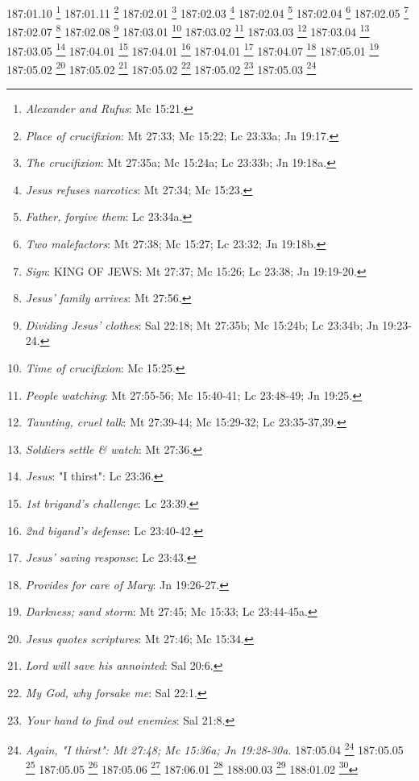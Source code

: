 {{{{{{{{{{{{{{{{{{{{{{{{{{{{{{{{{{{{{{{{{{{{{{{{{{{{{{{{{{{{{{{{{{{{{{{{{{{{{{{{{{{{{{{{{{{{{{187:01.10 \footnote{\textit{Alexander and Rufus}: Mc 15:21.}
187:01.11 \footnote{\textit{Place of crucifixion}: Mt 27:33; Mc 15:22; Lc 23:33a; Jn 19:17.}
187:02.01 \footnote{\textit{The crucifixion}: Mt 27:35a; Mc 15:24a; Lc 23:33b; Jn 19:18a.}
187:02.03 \footnote{\textit{Jesus refuses narcotics}: Mt 27:34; Mc 15:23.}
187:02.04 \footnote{\textit{Father, forgive them}: Lc 23:34a.}
187:02.04 \footnote{\textit{Two malefactors}: Mt 27:38; Mc 15:27; Lc 23:32; Jn 19:18b.}
187:02.05 \footnote{\textit{Sign}: KING OF JEWS: Mt 27:37; Mc 15:26; Lc 23:38; Jn 19:19-20.}
187:02.07 \footnote{\textit{Jesus' family arrives}: Mt 27:56.}
187:02.08 \footnote{\textit{Dividing Jesus' clothes}: Sal 22:18; Mt 27:35b; Mc 15:24b; Lc 23:34b; Jn 19:23-24.}
187:03.01 \footnote{\textit{Time of crucifixion}: Mc 15:25.}
187:03.02 \footnote{\textit{People watching}: Mt 27:55-56; Mc 15:40-41; Lc 23:48-49; Jn 19:25.}
187:03.03 \footnote{\textit{Taunting, cruel talk}: Mt 27:39-44; Mc 15:29-32; Lc 23:35-37,39.}
187:03.04 \footnote{\textit{Soldiers settle & watch}: Mt 27:36.}
187:03.05 \footnote{\textit{Jesus}: "I thirst": Lc 23:36.}
187:04.01 \footnote{\textit{1st brigand's challenge}: Lc 23:39.}
187:04.01 \footnote{\textit{2nd bigand's defense}: Lc 23:40-42.}
187:04.01 \footnote{\textit{Jesus' saving response}: Lc 23:43.}
187:04.07 \footnote{\textit{Provides for care of Mary}: Jn 19:26-27.}
187:05.01 \footnote{\textit{Darkness; sand storm}: Mt 27:45; Mc 15:33; Lc 23:44-45a.}
187:05.02 \footnote{\textit{Jesus quotes scriptures}: Mt 27:46; Mc 15:34.}
187:05.02 \footnote{\textit{Lord will save his annointed}: Sal 20:6.}
187:05.02 \footnote{\textit{My God, why forsake me}: Sal 22:1.}
187:05.02 \footnote{\textit{Your hand to find out enemies}: Sal 21:8.}
187:05.03 \footnote{\textit{Again, "I thirst": Mt 27:48; Mc 15:36a; Jn 19:28-30a.}
187:05.04 \footnote{\textit{Those who watched Jesus die}: Lc 23:49.}
187:05.05 \footnote{\textit{Jesus dies on cross}: Mt 27:50; Mc 15:37; Lc 23:46; Jn 19:30.}
187:05.05 \footnote{\textit{Truly, Son of God}: Mt 27:54; Mc 15:39; Lc 23:47.}
187:05.06 \footnote{\textit{It is finished.: Jn 19:30.}
187:05.07 \footnote{\textit{Day of preparation}: Mc 15:42; Lc 23:54; Jn 19:31ab,42a.}
187:05.07 \footnote{\textit{Request to break Jesus' legs}: Jn 19:31c.}
187:05.08 \footnote{\textit{No bones, spear pierces side}: Jn Jn}:32-34.}
187:06.01 \footnote{\textit{Darkness of sandstorm}: Mt 27:45; Mc 15:33; Lc 23:44-45a.}
188:00.03 \footnote{\textit{Friends retrieve body}: Mt 27:57-58; Mc 15:43-45; Lc 23:50-53a; Jn 19:38,40a.}
188:01.02 \footnote{\textit{Bury in new tomb}: Mt 27:59a,60; Mc 15:46; Lc 23:53; Jn 19:41,42b.}
}}}}}}}}}}}}}}}}}}}}}}}}}}}}}}}}}}}}}}}}}}}}}}}}}}}}}}}}}}}}}}}}}}}}}}}}}}}}}}}}}}}}}}}}}}}}}}}
